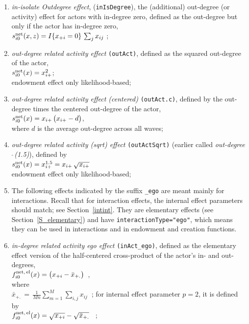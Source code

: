 \documentclass[a4paper,fleqn,11pt]{article}
\newcommand{\+}{\, + \,}
\newcommand{\vit}{\theenumi}
\begin{document}
\begin{enumerate}
\item \emph{in-isolate Outdegree effect}, (\texttt{inIsDegree}), the
      (additional) out-degree (or activity)
      effect for actors with in-degree zero, defined as the out-degree
      but only if the actor has in-degree zero,\\
 $s^{\rm net}_{i\vit}(x, z) =   I\{x_{+i} = 0 \}\, \sum_j x_{ij}   $ ;\\

 \item {\em out-degree related activity effect} \texttt{(outAct)},
 	 defined as the squared out-degree of the actor,\\
 $s^{\rm net}_{i\vit}(x) = x^2_{i+}$;\\
 endowment effect only likelihood-based;


 \item {\em out-degree related activity effect (centered)} \texttt{(outAct.c)},
 defined by the out-degree times the centered out-degree of the actor,\\
 $s^{\rm net}_{i\vit}(x) =  x_{i+}\,\big( x_{i+} - d \big)$,\\
 where $d$ is the average out-degree across all waves;

 \item {\em out-degree related activity (sqrt) effect}  \texttt{(outActSqrt)}
 (earlier called {\em out-degree$\,\hat{\ }$(1.5)}), defined by  \\
 $s^{\rm net}_{i\vit}(x) = x^{1.5}_{i+} = x_{i+}\,\sqrt{x_{i+}}$ \\
 endowment effect only likelihood-based;


 \item[{\hspace*{-1ex}$\bigodot$}]
The following effects indicated by the suffix \texttt{\_ego} are meant mainly for interactions.
Recall that for interaction effects, the internal effect parameters
should match; see Section~\ref{intint}.
They are elementary effects (see Section~\ref {S_elementary}) and have
\texttt{interactionType="ego"},
which means they can be used in interactions  and in endowment and creation functions.

 \item {\em in-degree related activity ego effect} \texttt{(inAct\_ego)},
 	 defined as the elementary effect version of the  half-centered  cross-product
 of the actor's in- and out-degrees,\\
 $ f^{\rm net,\, el}_{i\vit}(x) = \big(  x_{+i} - \bar x_{+.}\big)$\ ,\\
 where\\
 $ \bar x_{+.} \,=\,  \frac{1}{Mn} \sum_{m=1}^M \sum_{i,j} x_{ij} \ $ ;
 for internal effect parameter $p=2$, it is defined by\\
 $f^{\rm net,\, el}_{i\vit}(x)  =   \sqrt{   x_{+i}} - \sqrt{\bar x_{+.}} $ \ ; \\


\end{enumerate}
\end{document}
